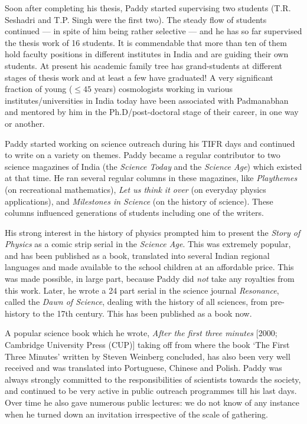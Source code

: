 \documentclass[prd, preprint, longbibliography, 11pt]{revtex4-1}
\begin{document}
Soon after completing his thesis, Paddy started supervising two
students (T.R. Seshadri and T.P. Singh were the first two). The steady
flow of students continued --- in spite of him being rather selective
--- and he has so far supervised the thesis work of 16 students.
It is commendable that more than ten  of them hold faculty positions
in different institutes in India  and are guiding their own students.
At present his academic family tree has grand-students at different
stages of thesis work and at least a few have graduated!
A very significant fraction of young ($\leq 45$ years)
cosmologists working in various institutes/universities in India today
have been associated with Padmanabhan and mentored by him in the
Ph.D/post-doctoral stage of their career, in one way or another. 

Paddy started working on science outreach during his TIFR days and
continued to write on a variety on themes.
Paddy became a regular contributor to two science magazines of India
(the \textit{Science Today} and the \textit{Science Age}) which
existed at that time. He ran several regular columns in these
magazines, like \textit{Playthemes} (on recreational mathematics),
\textit{Let us think it over} (on everyday physics applications), and
\textit{Milestones in Science} (on the history of science). These
columns influenced generations of students including one of the
writers. 

His strong interest in the history of physics prompted him to present
the \textit{Story of Physics} as a comic strip serial in the
\textit{Science Age}.
This was extremely popular, and has been published as a book, translated
into several Indian regional languages and made available to the
school children at an affordable price.
This was made possible, in large part,  because Paddy did
\textit{not} take any royalties from this work.
Later, he wrote a 24 part serial in the science journal
\textit{Resonance}, called the \textit{Dawn of Science}, dealing with
the history of all sciences, from pre-history to the 17th
century. This has been published as a book now. 

 A popular science book which he wrote, \textit{After the first three
   minutes} [2000; Cambridge University Press (CUP)] taking off from
 where the book `The First Three Minutes' written by Steven Weinberg
 concluded, has also been very well received and was translated into
 Portuguese, Chinese and Polish. Paddy was always strongly committed
 to the responsibilities of scientists towards the society, and
 continued to be very active in public outreach programmes till his
 last days. 
Over time he also gave
numerous public lectures: we do not know of any instance when he
turned down an invitation irrespective of the scale of gathering.  
\end{document}
